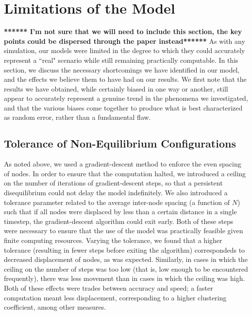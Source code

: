 \documentclass[aps,pre,reprint,superscriptaddress,amsmath,amssymb,nofootinbib]{revtex4-1}
\begin{document}
\section{Limitations of the Model}
\textbf{****** I'm not sure that we will need to include this section, the key points could be dispersed through the paper instead******}
As with any simulation, our models were limited in the degree to which they could accurately represent a ``real" scenario while still remaining practically computable.  
In this section, we discuss the necessary shortcomings we have identified in our model, and the effects we believe them to have had on our results.  
We first note that the results we have obtained, while certainly biased in one way or another, still appear to accurately represent a genuine trend in the phenomena we investigated, and that the various biases come together to produce what is best characterized as random error, rather than a fundamental flaw.

\subsection{Tolerance of Non-Equilibrium Configurations}
As noted above, we used a gradient-descent method to enforce the even spacing of nodes.  
In order to ensure that the computation halted, we introduced a ceiling on the number of iterations of gradient-descent steps, so that a persistent disequilibrium could not delay the model indefinitely.  
We also introduced a tolerance parameter related to the average inter-node spacing (a function of $N$) such that if all nodes were displaced by less than a certain distance in a single timestep, the gradient-descent algorithm could exit early.  
Both of these steps were necessary to ensure that the use of the model was practically feasible given finite computing resources.
Varying the tolerance, we found that a higher tolerance (resulting in fewer steps before exiting the algorithm) correspondeds to decreased displacement of nodes, as was expected.  
Similarly, in cases in which the ceiling on the number of steps was too low (that is, low enough to be encountered frequently), there was less movement than in cases in which the ceiling was high.  
Both of these effects were trades between accuracy and speed; a faster computation meant less displacement, corresponding to a higher clustering coefficient, among other measures.
\end{document}
